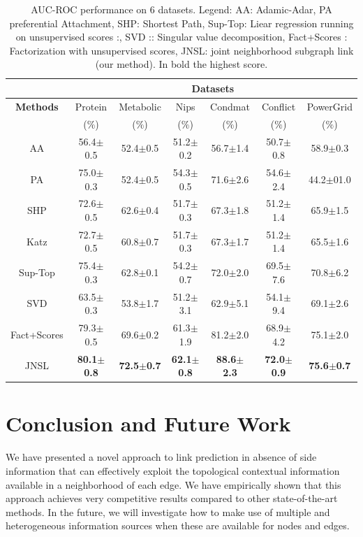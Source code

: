 \documentclass[runningheads,a4paper]{llncs}
\begin{document}
\begin{table}
\caption{AUC-ROC performance on 6 datasets. Legend: AA: Adamic-Adar, PA \cite{pa} preferential Attachment, SHP: Shortest Path, Sup-Top: Liear regression running on unsupervised scores \cite{matrix-factorization}:, SVD \cite{matrix-factorization}:: Singular value decomposition, Fact+Scores \cite{matrix-factorization}: Factorization with unsupervised scores, JNSL: joint neighborhood subgraph link (our method). In bold the highest score.}
\centering
\setlength{\tabcolsep}{1mm}
\begin{tabular}{|c|c|c|c|c|c|c|}

\hline
         & \multicolumn{6}{c|}{\textbf{Datasets}}\\
 \hline
\textbf{Methods} & Protein & Metabolic & Nips & Condmat & Conflict & PowerGrid\\
	& ($\%$) & ($\%$) & ($\%$) & ($\%$) & ($\%$) & ($\%$)\\
\hline
AA & 56.4$\pm$0.5 & 52.4$\pm$0.5 & 51.2$\pm$0.2 & 56.7$\pm$1.4 & 50.7$\pm$0.8 & 58.9$\pm$0.3\\
PA & 75.0$\pm$0.3 & 52.4$\pm$0.5 & 54.3$\pm$0.5 & 71.6$\pm$2.6 & 54.6$\pm$2.4 & 44.2$\pm$01.0\\
SHP & 72.6$\pm$0.5 & 62.6$\pm$0.4 & 51.7$\pm$0.3 & 67.3$\pm$1.8 & 51.2$\pm$1.4 & 65.9$\pm$1.5\\
Katz & 72.7$\pm$0.5 & 60.8$\pm$0.7 & 51.7$\pm$0.3 & 67.3$\pm$1.7 & 51.2$\pm$1.4 & 65.5$\pm$1.6 \\
Sup-Top & 75.4$\pm$0.3 & 62.8$\pm$0.1 & 54.2$\pm$0.7 & 72.0$\pm$2.0 & 69.5$\pm$7.6 & 70.8$\pm$6.2\\
SVD & 63.5$\pm$0.3 & 53.8$\pm$1.7 & 51.2$\pm$3.1 & 62.9$\pm$5.1 & 54.1$\pm$9.4 & 69.1$\pm$2.6\\
Fact+Scores & 79.3$\pm$0.5 & 69.6$\pm$0.2 & 61.3$\pm$1.9 & 81.2$\pm$2.0 & 68.9$\pm$4.2 & 75.1$\pm$2.0 \\
JNSL & \textbf{80.1$\pm$0.8} & \textbf{72.5$\pm$0.7} & \textbf{62.1$\pm$0.8} & \textbf{88.6$\pm$2.3} & \textbf{72.0$\pm$0.9} & \textbf{75.6$\pm$0.7} \\
 \hline 
\end{tabular}
\label{result_table}
\end{table}

\section{Conclusion and Future Work}
We have presented a novel approach to link prediction in absence of side information that can effectively exploit the topological contextual information available in a neighborhood of each edge. We have empirically shown that this approach achieves very competitive results compared to other state-of-the-art methods.
In the future, we will investigate how to make use of multiple and heterogeneous information sources when these are available for nodes and edges.
\end{document}
